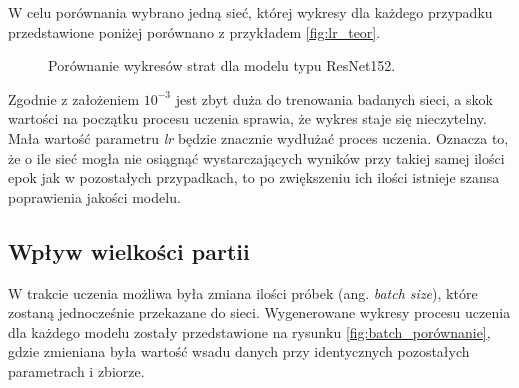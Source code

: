 \hspace{0.5cm}
W celu porównania wybrano jedną sieć, której wykresy dla każdego przypadku przedstawione poniżej porównano z przykładem \ref{fig:lr_teor}.
\begin{figure}[H]
\hspace{-2cm}
\hfill
\caption{Porównanie wykresów strat dla modelu typu ResNet152.}
\label{fig:lr_porównanie_calk}
\end{figure}

\hspace{0.5cm}
Zgodnie z założeniem $10^{-3}$ jest zbyt duża do trenowania badanych sieci, a skok wartości na początku procesu uczenia sprawia, że wykres staje się nieczytelny. Mała wartość parametru \emph{lr} będzie znacznie wydłużać proces uczenia. Oznacza to, że o ile sieć mogła nie osiągnąć wystarczających wyników przy takiej samej ilości epok jak w pozostałych przypadkach, to po zwiększeniu ich ilości istnieje szansa poprawienia jakości modelu.

\newpage
\subsection{Wpływ wielkości partii}
\hspace{0.5cm}
W trakcie uczenia możliwa była zmiana ilości próbek (ang. \emph{batch size}), które zostaną jednocześnie przekazane do sieci.
Wygenerowane wykresy procesu uczenia dla każdego modelu zostały przedstawione na rysunku \ref{fig:batch_porównanie}, gdzie zmieniana była wartość wsadu danych przy identycznych pozostałych parametrach i zbiorze.

